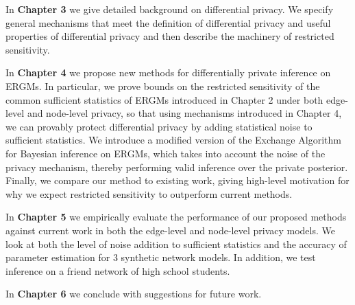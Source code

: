 In \textbf{Chapter 3} we give detailed background on differential privacy. We specify general mechanisms that meet the definition of differential privacy and useful properties of differential privacy and then describe the machinery of restricted sensitivity.

In \textbf{Chapter 4} we propose new methods for differentially private inference on ERGMs. In particular, we prove bounds on the restricted sensitivity of the common sufficient statistics of ERGMs introduced in Chapter 2 under both edge-level and node-level privacy, so that using mechanisms introduced in Chapter 4, we can provably protect differential privacy by adding statistical noise to sufficient statistics. We introduce a modified version of the Exchange Algorithm for Bayesian inference on ERGMs, which takes into account the noise of the privacy mechanism, thereby performing valid inference over the private posterior. Finally, we compare our method to existing work, giving high-level motivation for why we expect restricted sensitivity to outperform current methods.

In \textbf{Chapter 5} we empirically evaluate the performance of our proposed methods against current work in both the edge-level and node-level privacy models. We look at both the level of noise addition to sufficient statistics and the accuracy of parameter estimation for $3$ synthetic network models. In addition, we test inference on a friend network of high school students.  

In \textbf{Chapter 6} we conclude with suggestions for future work.